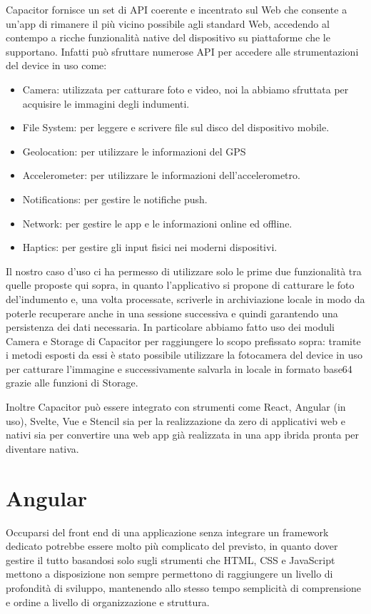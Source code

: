 Capacitor fornisce un set di API coerente e incentrato sul Web che consente a un'app di rimanere il più vicino possibile agli standard Web, accedendo al contempo a ricche funzionalità native del dispositivo su piattaforme che le supportano. Infatti può sfruttare numerose API per accedere alle strumentazioni del device in uso come:
\begin{itemize}
\item Camera: utilizzata per catturare foto e video, noi la abbiamo sfruttata per acquisire le immagini degli indumenti.
\item File System: per leggere e scrivere file sul disco del dispositivo mobile.
\item Geolocation: per utilizzare le informazioni del GPS 
\item Accelerometer: per utilizzare le informazioni dell’accelerometro.
\item Notifications: per gestire le notifiche push.
\item Network: per gestire le app e le informazioni online ed offline.
\item Haptics: per gestire gli input fisici nei moderni dispositivi.
\end{itemize}

Il nostro caso d'uso ci ha permesso di utilizzare solo le prime due funzionalità tra quelle proposte qui sopra, in quanto l'applicativo si propone di catturare le foto del'indumento e, una volta processate, scriverle in archiviazione locale in modo da poterle recuperare anche in una sessione successiva e quindi garantendo una persistenza dei dati necessaria. In particolare abbiamo fatto uso dei moduli Camera e Storage di Capacitor per raggiungere lo scopo prefissato sopra: tramite i metodi esposti da essi è stato possibile utilizzare la fotocamera del device in uso per catturare l'immagine e successivamente salvarla in locale in formato base64 grazie alle funzioni di Storage.

Inoltre Capacitor può essere integrato con strumenti come React, Angular (in uso), Svelte, Vue e Stencil sia per la realizzazione da zero di applicativi web e nativi sia per convertire una web app già realizzata in una app ibrida pronta per diventare nativa.

\section{Angular}

Occuparsi del front end di una applicazione senza integrare un framework dedicato potrebbe essere molto più complicato del previsto, in quanto dover gestire il tutto basandosi solo sugli strumenti che HTML, CSS  e JavaScript mettono a disposizione non sempre permettono di raggiungere un livello di profondità di sviluppo, mantenendo allo stesso tempo semplicità di comprensione e ordine a livello di organizzazione e struttura.

